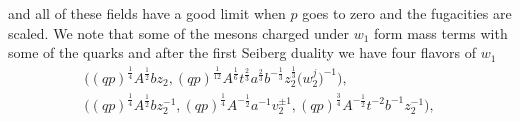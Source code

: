 \documentclass[a4paper,12pt]{article}
\begin{document}
 and all of these fields have a good limit when $p$ goes to zero and the fugacities are scaled. We note that some of the mesons charged under $w_1$ form mass terms with some of the quarks and after the first Seiberg duality we have four flavors of $w_1$
\begin{gather*}
 \big( (q p )^{\frac14} A^{\frac12}b z_2 , (q p) ^{\frac1{ 1 2 }} A^{\frac16} t^{\frac23} a^{\frac23} b^{-\frac13} z_2^{\frac13} \big(w_2^j\big)^{-1} \big) , \\
 \big((q p)^{\frac14} A^{\frac12} b z_2^{-1} , (q p)^{\frac14} A^{-\frac12} a^{-1} v_2^{\pm1} , (q p)^{\frac34} A^{-\frac12} t^{-2} b^{-1} z_2^{-1} \big) ,
\end{gather*}
\end{document}
